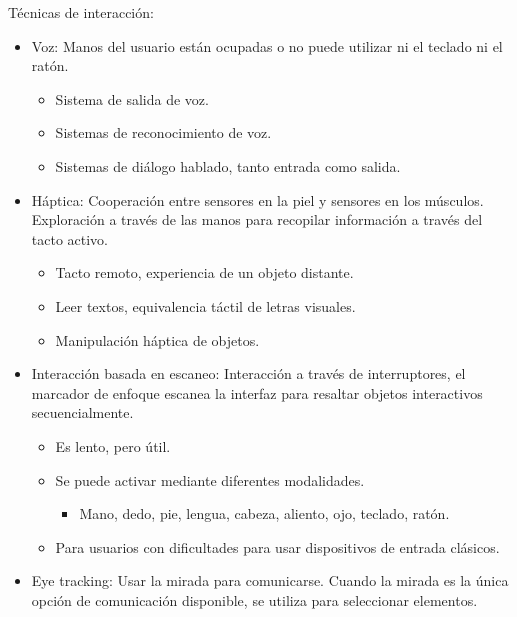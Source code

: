 \documentclass[12pt, twoside, openright]{report} %
\begin{document}
Técnicas de interacción:

\begin{itemize}
	\item Voz: Manos del usuario están ocupadas o no puede utilizar ni el
	      teclado ni el ratón.

	      \begin{itemize}
		      \item Sistema de salida de voz.

		      \item Sistemas de reconocimiento de voz.

		      \item Sistemas de diálogo hablado, tanto entrada como salida.
	      \end{itemize}
	\item Háptica: Cooperación entre sensores en la piel y sensores en los
	      músculos. Exploración a través de las manos para recopilar
	      información a través del tacto activo.

	      \begin{itemize}
		      \item Tacto remoto, experiencia de un objeto distante.

		      \item Leer textos, equivalencia táctil de letras visuales.

		      \item Manipulación háptica de objetos.
	      \end{itemize}
	\item Interacción basada en escaneo: Interacción a través de
	      interruptores, el marcador de enfoque escanea la interfaz para
	      resaltar objetos interactivos secuencialmente.

	      \begin{itemize}
		      \item Es lento, pero útil.

		      \item Se puede activar mediante diferentes modalidades.

		            \begin{itemize}
			            \item Mano, dedo, pie, lengua, cabeza, aliento, ojo, teclado, ratón.
		            \end{itemize}

		      \item Para usuarios con dificultades para usar dispositivos de entrada
		            clásicos.
	      \end{itemize}
	\item Eye tracking: Usar la mirada para comunicarse. Cuando la mirada es
	      la única opción de comunicación disponible, se utiliza para
	      seleccionar elementos.


\end{itemize}
\end{document}
